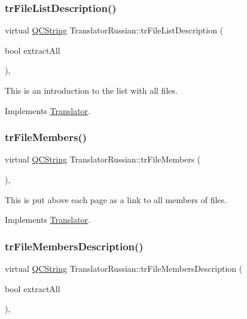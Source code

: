 \subsubsection{\texorpdfstring{trFileListDescription()}{trFileListDescription()}}
{\footnotesize\ttfamily virtual \mbox{\hyperlink{class_q_c_string}{Q\+C\+String}} Translator\+Russian\+::tr\+File\+List\+Description (\begin{DoxyParamCaption}\item[{bool}]{extract\+All }\end{DoxyParamCaption})\hspace{0.3cm}{\ttfamily [inline]}, {\ttfamily [virtual]}}

This is an introduction to the list with all files. 

Implements \mbox{\hyperlink{class_translator}{Translator}}.

\mbox{\label{class_translator_russian_ad2abe1a437f7212e0e5cecad387032ce}} 
\subsubsection{\texorpdfstring{trFileMembers()}{trFileMembers()}}
{\footnotesize\ttfamily virtual \mbox{\hyperlink{class_q_c_string}{Q\+C\+String}} Translator\+Russian\+::tr\+File\+Members (\begin{DoxyParamCaption}{ }\end{DoxyParamCaption})\hspace{0.3cm}{\ttfamily [inline]}, {\ttfamily [virtual]}}

This is put above each page as a link to all members of files. 

Implements \mbox{\hyperlink{class_translator}{Translator}}.

\mbox{\label{class_translator_russian_a83d4c2714d7259634854e08859f20774}} 
\subsubsection{\texorpdfstring{trFileMembersDescription()}{trFileMembersDescription()}}
{\footnotesize\ttfamily virtual \mbox{\hyperlink{class_q_c_string}{Q\+C\+String}} Translator\+Russian\+::tr\+File\+Members\+Description (\begin{DoxyParamCaption}\item[{bool}]{extract\+All }\end{DoxyParamCaption})\hspace{0.3cm}{\ttfamily [inline]}, {\ttfamily [virtual]}}

